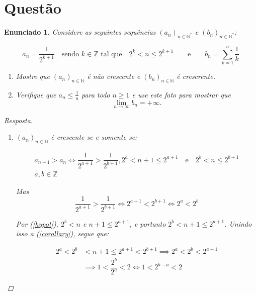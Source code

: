 \documentclass[a4paper,twoside,11pt]{article}
\newtheorem*{enunciado}{Enunciado}
\begin{document}
\section{Questão}
\begin{enunciado}
    Considere as seguintes sequências $(a_n)_{n \in \mathbb{N}^*}$ e $(b_n)_{n \in \mathbb{N}^*}$:

    $$a_n = \dfrac{1}{2^{k + 1}}\quad\text{sendo } k \in \mathbb{Z} \text{ tal que}\quad 2^k < n \leq 2^{k+1} \qquad \text{e} \qquad b_n = \sum_{k=1}^n \dfrac{1}{k}$$

    \begin{enumerate}[label=\alph*)]
        \item Mostre que $(a_n)_{n \in \mathbb{N}}$ é não crescente e 
            $(b_n)_{n \in \mathbb{N}}$ é crescrente.

        \item Verifique que $a_n \leq \frac{1}{n}$ para todo $n \geq 1$ e use este fato
        para mostrar que $$\lim_{n \rightarrow \infty}{b_n} = +\infty.$$
    \end{enumerate}

    \begin{proof}[Resposta]
        \begin{enumerate}[label=(\alph*)]
            \item $(a_n)_{n \in \mathbb{N}}$ é crescente se e somente se:

            \begin{equation} \tag{1} \label{hypot}
                \begin{split}
                a_{n+1} > a_n \iff \dfrac{1}{2^{a+1}} > \dfrac{1}{2^{b+1}},2^a < n + 1 \leq 2^{a + 1}\quad\text{e}\quad2^b < n \leq 2^{b + 1}\\
                a, b \in \mathbb{Z}
                \end{split}
            \end{equation}

            Mas \begin{equation} \tag{2} \label{corollary}
                \dfrac{1}{2^{a+1}} > \dfrac{1}{2^{b+1}} \iff 2^{a+1} < 2^{b+1} \iff 2^a < 2^b
            \end{equation}
            
            Por (\ref{hypot}), $2^b < n$ e $n + 1 \leq 2^{a + 1}$, e portanto $2^b < n + 1 \leq 2^{a+1}$.
            Unindo isso a (\ref{corollary}), segue que:

            \begin{align*}
                2^a < 2^b &< n + 1 \leq 2^{a + 1} < 2^{b+1} \implies 2^a < 2^b < 2^{a + 1}\\
                &\implies 1 < \dfrac{2^b}{2^a} < 2 \iff 1 < 2^{b-a} < 2
            \end{align*}


\end{enumerate}
\end{proof}
\end{enunciado}
\end{document}
